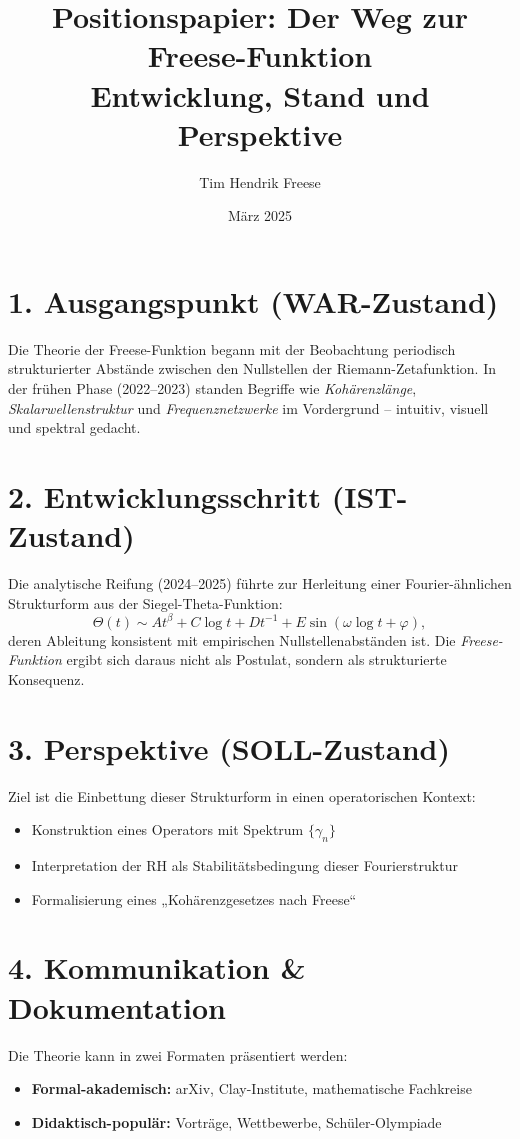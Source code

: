 \documentclass[12pt]{article}
\title{Positionspapier: Der Weg zur Freese-Funktion\\
\large Entwicklung, Stand und Perspektive}
\author{Tim Hendrik Freese}
\date{März 2025}
\begin{document}
\maketitle

\section*{1. Ausgangspunkt (WAR-Zustand)}

Die Theorie der Freese-Funktion begann mit der Beobachtung periodisch strukturierter Abstände zwischen den Nullstellen der Riemann-Zetafunktion.  
In der frühen Phase (2022–2023) standen Begriffe wie \emph{Kohärenzlänge}, \emph{Skalarwellenstruktur} und \emph{Frequenznetzwerke} im Vordergrund – intuitiv, visuell und spektral gedacht.

\section*{2. Entwicklungsschritt (IST-Zustand)}

Die analytische Reifung (2024–2025) führte zur Herleitung einer Fourier-ähnlichen Strukturform aus der Siegel-Theta-Funktion:
\[
\Theta(t) \sim A t^{\beta} + C \log t + D t^{-1} + E \sin(\omega \log t + \varphi),
\]
deren Ableitung konsistent mit empirischen Nullstellenabständen ist.  
Die \emph{Freese-Funktion} ergibt sich daraus nicht als Postulat, sondern als strukturierte Konsequenz.

\section*{3. Perspektive (SOLL-Zustand)}

Ziel ist die Einbettung dieser Strukturform in einen operatorischen Kontext:
\begin{itemize}
  \item Konstruktion eines Operators mit Spektrum \( \{ \gamma_n \} \)
  \item Interpretation der RH als Stabilitätsbedingung dieser Fourierstruktur
  \item Formalisierung eines „Kohärenzgesetzes nach Freese“
\end{itemize}

\section*{4. Kommunikation \& Dokumentation}

Die Theorie kann in zwei Formaten präsentiert werden:
\begin{itemize}
  \item \textbf{Formal-akademisch:} arXiv, Clay-Institute, mathematische Fachkreise
  \item \textbf{Didaktisch-populär:} Vorträge, Wettbewerbe, Schüler-Olympiade
\end{itemize}
\end{document}
